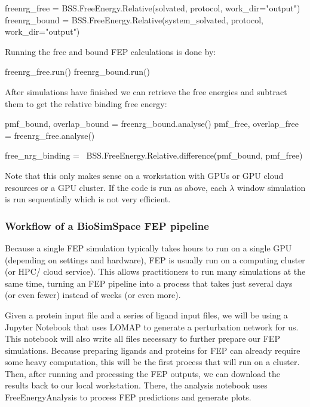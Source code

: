 \begin{python}
freenrg_free = BSS.FreeEnergy.Relative(solvated, 
                        protocol, work_dir="output")
freenrg_bound = BSS.FreeEnergy.Relative(system_solvated, 
                        protocol, work_dir="output")
\end{python}

\noindent Running the free and bound FEP calculations is done by:

\begin{python}
freenrg_free.run() 
freenrg_bound.run() 
\end{python}
\noindent After simulations have finished we can retrieve the free energies and subtract them to get the relative binding free energy:
\begin{python}
pmf_bound, overlap_bound = freenrg_bound.analyse()
pmf_free,  overlap_free  = freenrg_free.analyse()

free_nrg_binding = \
BSS.FreeEnergy.Relative.difference(pmf_bound, pmf_free)
\end{python}

\noindent Note that this only makes sense on a workstation with GPUs or GPU cloud resources or a GPU cluster. If the code is run as above, each $\lambda$ window simulation is run sequentially which is not very efficient.

\subsubsection{Workflow of a BioSimSpace FEP pipeline}

Because a single FEP simulation typically takes hours to run on a
single GPU (depending on settings and hardware), FEP is usually run on a
computing cluster (or HPC/ cloud service). This allows practitioners to
run many simulations at the same time, turning an FEP pipeline into a
process that takes just several days (or even fewer) instead of weeks (or
even more).

Given a protein input file and a series of ligand input files, we will
be using a Jupyter Notebook that uses LOMAP to generate a perturbation
network for us. This notebook will also write all files necessary to
further prepare our FEP simulations. Because preparing ligands and
proteins for FEP can already require some heavy computation, this will
be the first process that will run on a cluster. Then, after running and
processing the FEP outputs, we can download the results back to our
local workstation. There, the analysis notebook uses FreeEnergyAnalysis
to process FEP predictions and generate plots.


